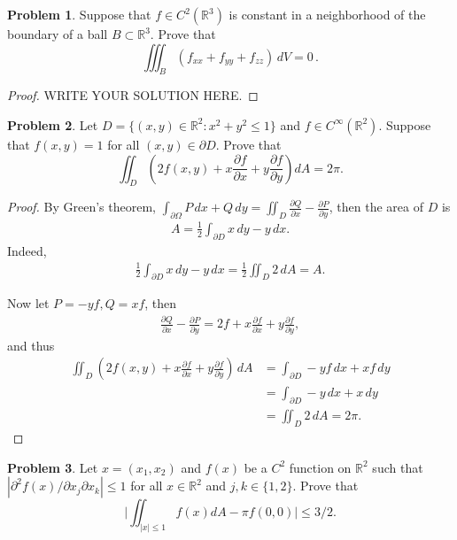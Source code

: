 \documentclass[11pt]{article}
\theoremstyle{definition}
\newtheorem{problem}{Problem}
\theoremstyle{definition}
\begin{document}
\medskip

\begin{problem}
Suppose that $f\in C^2(\mathbb{R}^3)$ is constant in a neighborhood of the boundary of
a ball $B\subset\mathbb{R}^3$. Prove that
$$
\iiint_B (f_{xx}+f_{yy}+f_{zz})\, dV = 0\, .
$$
\end{problem}
\begin{proof}
	WRITE YOUR SOLUTION HERE.
\end{proof}


\medskip

\begin{problem}
Let $D =\{(x, y)\in\mathbb{R}^2 : x^2 + y^2\leq 1\}$ and $f\in C^\infty(\mathbb{R}^2)$. Suppose that $f(x, y) = 1$ for all
$(x, y)\in\partial D$. Prove that
$$
\iint_D \left(2f(x,y)+x\frac{\partial f}{\partial x}+y\frac{\partial f}{\partial y}\right)dA=2\pi.
$$
\end{problem}
\begin{proof}
By Green's theorem, $\int_{\partial \Omega} P\, dx + Q\, dy = \iint_D \frac{\partial Q}{\partial x} - \frac{\partial P}{\partial y}$, then the area of $D$ is 
\begin{align*}
    A = \frac{1}{2} \int_{\partial D} x\, dy - y\, dx.
\end{align*}
Indeed, 
\begin{align*}
    \frac{1}{2} \int_{\partial D} x\, dy - y\, dx = \frac{1}{2} \iint_D 2\, dA = A.
\end{align*}

Now let $P = -yf, Q = xf$, then 
\begin{align*}
    \frac{\partial Q}{\partial x} - \frac{\partial P}{\partial y} = 2f + x \frac{\partial f}{\partial x} + y \frac{\partial f}{\partial y},
\end{align*}
and thus
\begin{align*}
    \iint_D \left(2f(x,y)+x\frac{\partial f}{\partial x}+y\frac{\partial f}{\partial y}\right)\, dA & = \int_{\partial D} -yf\, dx + x f\, dy \\
    & = \int_{\partial D} -y \, dx + x \, dy \\
    & = \iint_D 2\, dA = 2\pi.
\end{align*}
\end{proof}


\medskip

\begin{problem}
Let $x = (x_1, x_2)$  and $f(x) $ be a $C^2$ function on $\mathbb{R}^2$ such that
$ |\partial^2 f (x)/\partial x_j \partial x_k| \le 1$ for all $x \in \mathbb{R}^2$ and $ j, k \in \{1,2\}$.
Prove that
$$
\bigg|\iint_{|x| \le 1} f(x) dA - \pi f(0,0)\bigg| \le 3/2.
$$
\end{problem}
\end{document}
